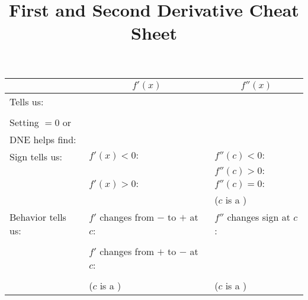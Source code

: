 \documentclass{siproblemset}
\title{First and Second Derivative Cheat Sheet}
\newcommand*{\thead}[1]{\multicolumn{1}{c|}{\bfseries #1}}
\begin{document}
    \maketitle
    \vspace{-1cm}
    \begin{center}
        \begin{tabular}{|l|l|l|}
            \hline
            & \thead{$f'(x)$} & \thead{$f''(x)$} \\
            \hline
            Tells us: &\hspace{6cm} &\hspace{6cm} \\
            & & \\
            \hline
            Setting $=0$ or & & \\ DNE helps find:& & \\
            \hline
            Sign tells us:& $f'(x) < 0:$ &  $f''(c) < 0:$ \\
            &  &  $f''(c) > 0:$ \\ 
            & $f'(x) > 0:$ &  $f''(c) = 0:$ \\
            & &($c$ is a \underline{\hspace{5cm}}) \\
            \hline
            Behavior tells us:&  $f'$ changes from $-$ to $+$ at $c$:  &  $f''$ changes sign at $c$: \\
            & & \\
            & $f'$ changes from $+$ to $-$ at $c$: &   \\
            &  & \\
            & ($c$ is a \underline{\hspace{5cm}})&($c$ is a \underline{\hspace{5cm}}) \\
            \hline
        \end{tabular}
    
    \vspace{0.5cm}
    
    \end{center}
\end{document}
